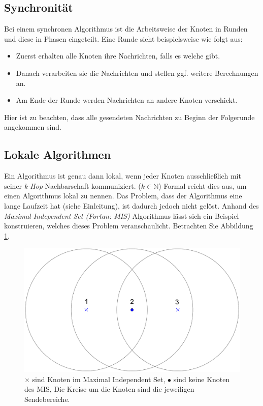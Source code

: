 \documentclass[a4paper,twoside]{IEEEtran}
\begin{document}
\subsection{Synchronität}
Bei einem synchronen Algorithmus ist die Arbeitsweise der Knoten in Runden und diese in Phasen eingeteilt. 
Eine Runde sieht beispielsweise wie folgt aus:
\begin{itemize}
\item Zuerst erhalten alle Knoten ihre Nachrichten, falls es welche gibt.
\item Danach verarbeiten sie die Nachrichten und stellen ggf. weitere Berechnungen an.
\item Am Ende der Runde werden Nachrichten an andere Knoten verschickt.
\end{itemize}
Hier ist zu beachten, dass alle gesendeten Nachrichten zu Beginn der Folgerunde angekommen sind.

\subsection{Lokale Algorithmen} \label{lokal}
Ein Algorithmus ist genau dann lokal, wenn jeder Knoten ausschließlich mit seiner \emph{k-Hop} Nachbarschaft kommuniziert. ($k \in \mathds{N}$)
Formal reicht dies aus, um einen Algorithmus lokal zu nennen.
Das Problem, dass der Algorithmus eine lange Laufzeit hat (siehe Einleitung), ist dadurch jedoch nicht gelöst.
Anhand des \emph{Maximal Independent Set (Fortan: MIS)} Algorithmus lässt sich ein Beispiel konstruieren, welches dieses Problem veranschaulicht.
Betrachten Sie Abbildung \ref{fig:MIS}.

\begin{figure}[h!]
\centering
\includegraphics[width=0.99\linewidth]{MIS.eps}
\caption{$\times $ sind Knoten im Maximal Independent Set, $\bullet $ sind keine Knoten des MIS, Die Kreise um die Knoten sind die jeweiligen Sendebereiche.}
\label{fig:MIS}
\end{figure}
\end{document}
